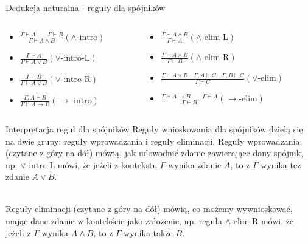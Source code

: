 \documentclass{beamer}
\newcommand{\impl}{\rightarrow}
\renewcommand{\implies}{\rightarrow}
\begin{document}
\begin{frame}{Dedukcja naturalna - reguły dla spójników}
\begin{columns}
	\begin{column}{0.5\textwidth}
	\begin{itemize}
		\setlength\itemsep{2em}
		\item $\displaystyle \frac{\Gamma \vdash A \qquad \Gamma \vdash B}{\Gamma \vdash A \land B} (\land\text{-intro})$
		\item $\displaystyle \frac{\Gamma \vdash A}{\Gamma \vdash A \lor B} (\lor\text{-intro-L})$
		\item $\displaystyle \frac{\Gamma \vdash B}{\Gamma \vdash A \lor B} (\lor\text{-intro-R})$
		\item $\displaystyle \frac{\Gamma, A \vdash B}{\Gamma \vdash A \implies B} (\implies\text{-intro})$
	\end{itemize}
	\end{column}
	
	\begin{column}{0.8\textwidth}
	\begin{itemize}
		\setlength\itemsep{2em}
		\item $\displaystyle \frac{\Gamma \vdash A \land B}{\Gamma \vdash A} (\land\text{-elim-L})$
		\item $\displaystyle \frac{\Gamma \vdash A \land B}{\Gamma \vdash B} (\land\text{-elim-R})$
		\item $\displaystyle \frac{\Gamma \vdash A \lor B \quad \Gamma, A \vdash C \quad \Gamma, B \vdash C}{\Gamma \vdash C} (\lor\text{-elim})$
		\item $\displaystyle \frac{\Gamma \vdash A \impl B \qquad \Gamma \vdash A}{\Gamma \vdash B} (\impl\text{-elim})$
	\end{itemize}
	\end{column}
\end{columns}
\end{frame}

\begin{frame}{Interpretacja reguł dla spójników}
	Reguły wnioskowania dla spójników dzielą się na dwie grupy: reguły wprowadzania i reguły eliminacji. Reguły wprowadzania (czytane z góry na dół) mówią, jak udowodnić zdanie zawierające dany spójnik, np. $\lor\text{-intro-L}$ mówi, że jeżeli z kontekstu $\Gamma$ wynika zdanie $A$, to z $\Gamma$ wynika też zdanie $A \lor B$. \\~\
	
	Reguły eliminacji (czytane z góry na dół) mówią, co możemy wywnioskować, mając dane zdanie w kontekście jako założenie, np. reguła $\land\text{-elim-R}$ mówi, że jeżeli z $\Gamma$ wynika $A \land B$, to z $\Gamma$ wynika także $B$.
\end{frame}
\end{document}
